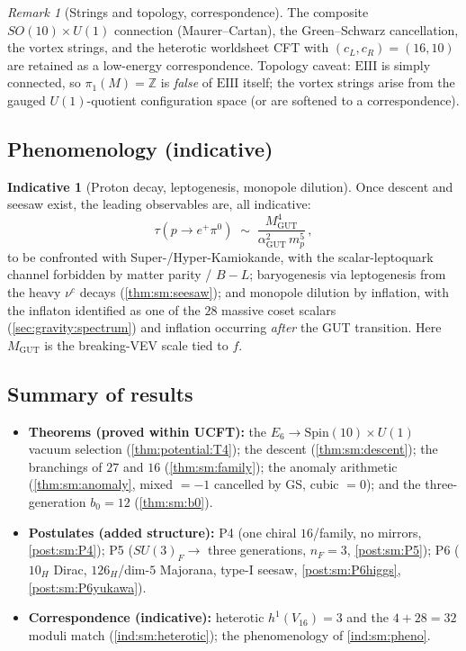 \documentclass[11pt]{article}
\theoremstyle{plain}
\theoremstyle{definition}
\newtheorem{indicative}[theorem]{Indicative}
\theoremstyle{remark}
\newtheorem{remark}[theorem]{Remark}
\begin{document}
\begin{remark}[Strings and topology, correspondence]\label{rem:sm:strings}
The composite $SO(10)\times U(1)$ connection (Maurer--Cartan), the Green--Schwarz
cancellation, the vortex strings, and the heterotic worldsheet CFT with
$(c_L,c_R)=(16,10)$ are retained as a low-energy correspondence. Topology caveat:
$\mathrm{EIII}$ is simply connected, so $\pi_1(M)=\mathbb{Z}$ is \emph{false} of
$\mathrm{EIII}$ itself; the vortex strings arise from the gauged $U(1)$-quotient
configuration space (or are softened to a correspondence).
\end{remark}

\subsection{Phenomenology (indicative)}
\label{sec:sm:pheno}

\begin{indicative}[Proton decay, leptogenesis, monopole dilution]\label{ind:sm:pheno}
Once descent and seesaw exist, the leading observables are, all indicative:
\begin{equation}\label{eq:sm:proton}
\tau(p\to e^+\pi^0)\;\sim\;\frac{M_{\mathrm{GUT}}^4}{\alpha_{\mathrm{GUT}}^2\,m_p^5}\,,
\end{equation}
to be confronted with Super-/Hyper-Kamiokande, with the scalar-leptoquark channel
forbidden by matter parity / $B\!-\!L$; baryogenesis via leptogenesis from the heavy
$\nu^c$ decays (\autoref{thm:sm:seesaw}); and monopole dilution by inflation, with the
inflaton identified as one of the $28$ massive coset scalars
(\autoref{sec:gravity:spectrum}) and inflation occurring \emph{after} the GUT
transition. Here $M_{\mathrm{GUT}}$ is the breaking-VEV scale tied to $f$.
\end{indicative}

\subsection{Summary of results}
\label{sec:sm:summary}

\begin{itemize}
\item \textbf{Theorems (proved within UCFT):} the $E_6\to\mathrm{Spin}(10)\times U(1)$
vacuum selection (\autoref{thm:potential:T4}); the descent
(\autoref{thm:sm:descent}); the branchings of $27$ and $16$
(\autoref{thm:sm:family}); the anomaly arithmetic
(\autoref{thm:sm:anomaly}, mixed $=-1$ cancelled by GS, cubic $=0$); and the
three-generation $b_0=12$ (\autoref{thm:sm:b0}).
\item \textbf{Postulates (added structure):} P4 (one chiral $16$/family, no mirrors,
\autoref{post:sm:P4}); P5 ($SU(3)_F\to$ three generations, $n_F=3$,
\autoref{post:sm:P5}); P6 ($10_H$ Dirac, $126_H$/dim-$5$ Majorana, type-I seesaw,
\autoref{post:sm:P6higgs}, \autoref{post:sm:P6yukawa}).
\item \textbf{Correspondence (indicative):} heterotic $h^1(V_{16})=3$ and the
$4+28=32$ moduli match (\autoref{ind:sm:heterotic}); the phenomenology of
\autoref{ind:sm:pheno}.
\end{itemize}
\end{document}
